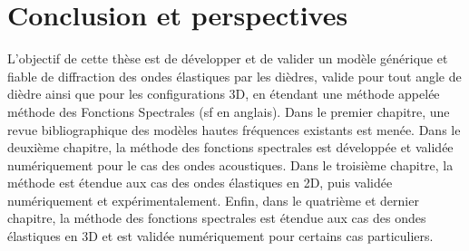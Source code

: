\section[Conclusion et perspectives]{Conclusion et perspectives}

\hspace{2em}L'objectif de cette thèse est de développer et de valider un modèle générique et fiable de diffraction des ondes élastiques par les dièdres, valide pour tout angle de dièdre ainsi que pour les configurations 3D, en étendant une méthode appelée méthode des Fonctions Spectrales (\acrshort{sf} en anglais). Dans le premier chapitre, une revue bibliographique des modèles hautes fréquences existants est menée. Dans le deuxième chapitre, la méthode des fonctions spectrales est développée et validée numériquement pour le cas des ondes acoustiques. Dans le troisième chapitre, la méthode est étendue aux cas des ondes élastiques en 2D, puis validée numériquement et expérimentalement. Enfin, dans le quatrième et dernier chapitre, la méthode des fonctions spectrales est étendue aux cas des ondes élastiques en 3D et est validée numériquement pour certains cas particuliers.

